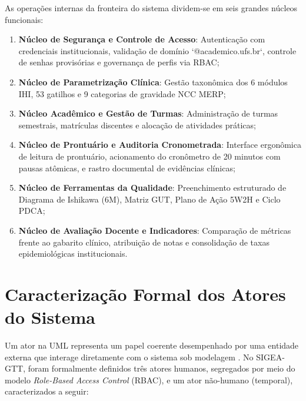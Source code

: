 As operações internas da fronteira do sistema dividem-se em seis grandes núcleos funcionais:
\begin{enumerate}
    \item \textbf{Núcleo de Segurança e Controle de Acesso}: Autenticação com credenciais institucionais, validação de domínio `@academico.ufs.br`, controle de senhas provisórias e governança de perfis via RBAC;
    \item \textbf{Núcleo de Parametrização Clínica}: Gestão taxonômica dos 6 módulos IHI, 53 gatilhos e 9 categorias de gravidade NCC MERP;
    \item \textbf{Núcleo Acadêmico e Gestão de Turmas}: Administração de turmas semestrais, matrículas discentes e alocação de atividades práticas;
    \item \textbf{Núcleo de Prontuário e Auditoria Cronometrada}: Interface ergonômica de leitura de prontuário, acionamento do cronômetro de 20 minutos com pausas atômicas, e rastro documental de evidências clínicas;
    \item \textbf{Núcleo de Ferramentas da Qualidade}: Preenchimento estruturado de Diagrama de Ishikawa (6M), Matriz GUT, Plano de Ação 5W2H e Ciclo PDCA;
    \item \textbf{Núcleo de Avaliação Docente e Indicadores}: Comparação de métricas frente ao gabarito clínico, atribuição de notas e consolidação de taxas epidemiológicas institucionais.
\end{enumerate}

\section{Caracterização Formal dos Atores do Sistema}
\label{sec_caracterizacao_atores}

Um ator na UML representa um papel coerente desempenhado por uma entidade externa que interage diretamente com o sistema sob modelagem \cite{omg2017}. No SIGEA-GTT, foram formalmente definidos três atores humanos, segregados por meio do modelo \textit{Role-Based Access Control} (RBAC), e um ator não-humano (temporal), caracterizados a seguir:

